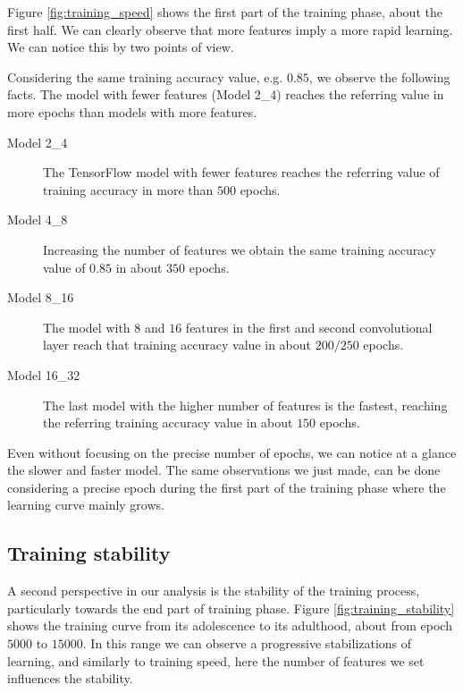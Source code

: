 Figure \ref{fig:training_speed} shows the first part of the training phase, about the first half. We can clearly observe that more features imply a more rapid learning. We can notice this by two points of view.

Considering the same training accuracy value, e.g. $0.85$, we observe the following facts. The model with fewer features (Model 2\_4) reaches the referring value in more epochs than models with more features.

\begin{description}
	\item[Model 2\_4] The TensorFlow model with fewer features reaches the referring value of training accuracy in more than $500$ epochs.
	\item[Model 4\_8] Increasing the number of features we obtain the same training accuracy value of $0.85$ in about $350$ epochs.
	\item[Model 8\_16] The model with $8$ and $16$ features in the first and second convolutional layer reach that training accuracy value in about $200/250$ epochs.
	\item[Model 16\_32] The last model with the higher number of features is the fastest, reaching the referring training accuracy value in about $150$ epochs.
\end{description}

Even without focusing on the precise number of epochs, we can notice at a glance the slower and faster model. The same observations we just made, can be done considering a precise epoch during the first part of the training phase where the learning curve mainly grows.

\subsection{Training stability}

A second perspective in our analysis is the stability of the training process, particularly towards the end part of training phase. Figure \ref{fig:training_stability} shows the training curve from its adolescence to its adulthood, about from epoch $5000$ to $15000$. In this range we can observe a progressive stabilizations of learning, and similarly to training speed, here the number of features we set influences the stability.

